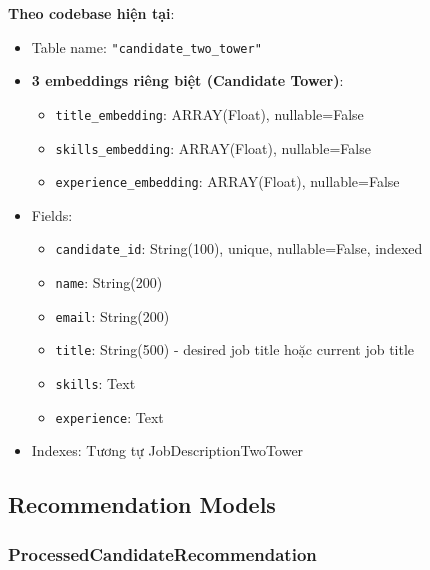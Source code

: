 \textbf{Theo codebase hiện tại}:
\begin{itemize}
    \item Table name: \texttt{"candidate\_two\_tower"}
    \item \textbf{3 embeddings riêng biệt (Candidate Tower)}:
    \begin{itemize}
        \item \texttt{title\_embedding}: ARRAY(Float), nullable=False
        \item \texttt{skills\_embedding}: ARRAY(Float), nullable=False
        \item \texttt{experience\_embedding}: ARRAY(Float), nullable=False
    \end{itemize}
    \item Fields:
    \begin{itemize}
        \item \texttt{candidate\_id}: String(100), unique, nullable=False, indexed
        \item \texttt{name}: String(200)
        \item \texttt{email}: String(200)
        \item \texttt{title}: String(500) - desired job title hoặc current job title
        \item \texttt{skills}: Text
        \item \texttt{experience}: Text
    \end{itemize}
    \item Indexes: Tương tự JobDescriptionTwoTower
\end{itemize}

\subsection{Recommendation Models}

\subsubsection{ProcessedCandidateRecommendation}

